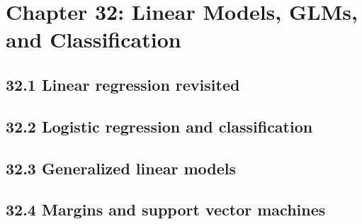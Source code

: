 \section{Chapter 32: Linear Models, GLMs, and Classification}

\subsection{32.1 Linear regression revisited}

\subsection{32.2 Logistic regression and classification}

\subsection{32.3 Generalized linear models}

\subsection{32.4 Margins and support vector machines}

\clearpage

